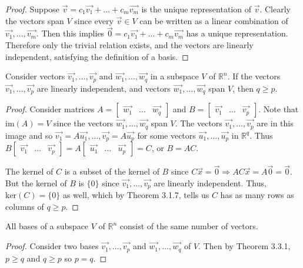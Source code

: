 \documentclass[a4paper,11pt]{article}
\begin{document}
\begin{outline}
\begin{proof}
      \backward
        Suppose \(\vec{v} = c_1\vec{v_1} + \ldots + c_m\vec{v_m}\) is the unique representation of \(\vec{v}\). Clearly
        the vectors span \(V\) since every \(\vec{v} \in V\) can be written as a linear combination of \(\vec{v_1}, 
        \ldots, \vec{v_m}\). Then this implies \(\vec{0} = c_1\vec{v_1} + \ldots + c_m\vec{v_m}\) has a unique
        representation. Therefore only the trivial relation exists, and the vectors are linearly independent, satisfying
        the definition of a basis.
    \end{proof}
    
    Consider vectors \(\vec{v_1}, \ldots, \vec{v_p}\) and \(\vec{w_1}, \ldots, \vec{w_q}\) in a subspace \(V\)
    of \(\mathbb{R}^n\). If the vectors \(\vec{v_1}, \ldots, \vec{v_p}\) are linearly independent, and vectors
    \(\vec{w_1}, \ldots, \vec{w_q}\) span \(V\), then \(q \geq p\).
    
    \begin{proof}
      Consider matrices \(A = \begin{bmatrix} \vec{w_1} & \ldots & \vec{w_q} \end{bmatrix}\) and
      \(B = \begin{bmatrix} \vec{v_1} & \ldots & \vec{v_p} \end{bmatrix}\). Note that \(\text{im}(A) = V\) 
      since the vectors \(\vec{w_1}, \ldots, \vec{w_q}\) span \(V\). The vectors \(\vec{v_1}, \ldots, 
      \vec{v_p}\) are in this image and so \(\vec{v_1} = A\vec{u_1}, \ldots, \vec{v_p} = A\vec{u_p}\) for 
      some vectors \(\vec{u_1}, \ldots, \vec{u_p}\) in \(\mathbb{R}^q\). Thus \(B \begin{bmatrix} \vec{v_1} 
      & \ldots & \vec{v_p} \end{bmatrix} = A \begin{bmatrix} \vec{u_1} & \ldots & \vec{u_p} \end{bmatrix} = C\),
      or \(B = AC\). 
      
      The kernel of \(C\) is a subset of the kernel of \(B\) since \(C\vec{x} = \vec{0} \Rightarrow AC\vec{x} =
      A\vec{0} = \vec{0}\). But the kernel of \(B\) is \(\{0\}\) since \(\vec{v_1}, \ldots, \vec{v_p}\) are
      linearly independent. Thus, \(\text{ker}(C) = \{0\}\) as well, which by Theorem 3.1.7, tells us \(C\) has
      as many rows as columns of \(q \geq p\).
    \end{proof}
    
    All bases of a subspace \(V\) of \(\mathbb{R}^n\) consist of the same number of vectors.
    
    \begin{proof}
      Consider two bases \(\vec{v_1}, \ldots, \vec{v_p}\) and \(\vec{w_1}, \ldots, \vec{w_q}\) of \(V\).
      Then by Theorem 3.3.1, \(p \geq q\) and \(q \geq p\) so \(p = q\).
    \end{proof}
    
\end{outline}
\end{document}
